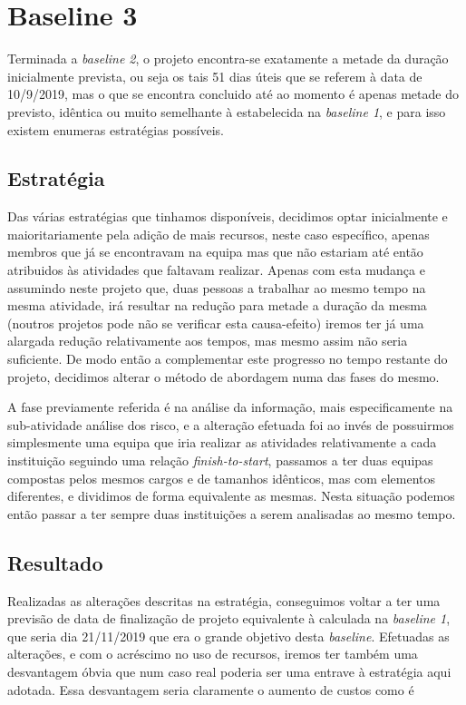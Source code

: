 \section{Baseline 3}
Terminada a \textit{baseline 2}, o projeto encontra-se exatamente a metade da duração inicialmente prevista, ou seja os tais 51 dias úteis que se referem à data de 10/9/2019, mas o que se encontra concluido até ao momento é apenas metade do previsto, idêntica ou muito semelhante à estabelecida na \textit{baseline 1}, e para isso existem enumeras estratégias possíveis.
\subsection{Estratégia}
Das várias estratégias que tinhamos disponíveis, decidimos optar inicialmente e maioritariamente pela adição de mais recursos, neste caso específico, apenas membros que já se encontravam na equipa mas que não estariam até então atribuidos às atividades que faltavam realizar. Apenas com esta mudança e assumindo neste projeto que, duas pessoas a trabalhar ao mesmo tempo na mesma atividade, irá resultar na redução para metade a duração da mesma (noutros projetos pode não se verificar esta causa-efeito) iremos ter já uma alargada redução relativamente aos tempos, mas mesmo assim não seria suficiente. De modo então a complementar este progresso no tempo restante do projeto, decidimos alterar o método de abordagem numa das fases do mesmo.

A fase previamente referida é na análise da informação, mais especificamente na sub-atividade análise dos risco, e a alteração efetuada foi ao invés de possuirmos simplesmente uma equipa que iria realizar as atividades relativamente a cada instituição seguindo uma relação \textit{finish-to-start}, passamos a ter duas equipas compostas pelos mesmos cargos e de tamanhos idênticos, mas com elementos diferentes, e dividimos de forma equivalente as mesmas. Nesta situação podemos então passar a ter sempre duas instituições a serem analisadas ao mesmo tempo.

\subsection{Resultado}
Realizadas as alterações descritas na estratégia, conseguimos voltar a ter uma previsão de data de finalização de projeto equivalente à calculada na \textit{baseline 1}, que seria dia 21/11/2019 que era o grande objetivo desta \textit{baseline}.
Efetuadas as alterações, e com o acréscimo no uso de recursos, iremos ter também uma desvantagem óbvia que num caso real poderia ser uma entrave à estratégia aqui adotada. Essa desvantagem seria claramente o aumento de custos como é